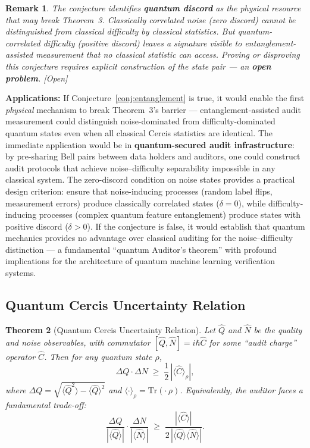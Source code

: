 \documentclass[12pt,a4paper]{article}
\newtheorem{theorem}{Theorem}[section]
\newtheorem{remark}[theorem]{Remark}
\newcommand{\openquest}{\textcolor{red!70!black}{\small\textsf{[Open]}}}
\newcommand{\Tr}{\mathrm{Tr}}
\begin{document}
\begin{remark}
The conjecture identifies \textbf{quantum discord} as the physical resource
that may break Theorem~3.  Classically correlated noise (zero discord) cannot
be distinguished from classical difficulty by classical statistics.  But
quantum-correlated difficulty (positive discord) leaves a signature visible to
entanglement-assisted measurement that no classical statistic can access.
Proving or disproving this conjecture requires explicit construction of the
state pair — an \textbf{open problem}.  \openquest
\end{remark}

\medskip\noindent
\textbf{Applications:}
If Conjecture~\ref{conj:entanglement} is true, it would enable the first
\emph{physical} mechanism to break Theorem~3's barrier — entanglement-assisted
audit measurement could distinguish noise-dominated from difficulty-dominated
quantum states even when all classical Cercis statistics are identical.
The immediate application would be in \textbf{quantum-secured audit
infrastructure}: by pre-sharing Bell pairs between data holders and auditors,
one could construct audit protocols that achieve noise--difficulty separability
impossible in any classical system.  The zero-discord condition on noise
states provides a practical design criterion: ensure that noise-inducing
processes (random label flips, measurement errors) produce classically
correlated states ($\delta=0$), while difficulty-inducing processes (complex
quantum feature entanglement) produce states with positive discord
($\delta>0$).  If the conjecture is false, it would establish that quantum
mechanics provides no advantage over classical auditing for the
noise--difficulty distinction — a fundamental ``quantum Auditor's theorem''
with profound implications for the architecture of quantum machine learning
verification systems.

\subsection{Quantum Cercis Uncertainty Relation}

\begin{theorem}[Quantum Cercis Uncertainty Relation]
\label{thm:uncertainty}
Let $\hat{Q}$ and $\hat{N}$ be the quality and noise observables, with
commutator $[\hat{Q},\hat{N}]=i\hbar\hat{C}$ for some ``audit charge''
operator $\hat{C}$.  Then for any quantum state $\rho$,
\begin{equation}\label{eq:cercis-uncertainty}
    \Delta Q \cdot \Delta N \;\geq\;
    \frac{1}{2}\,|\langle\hat{C}\rangle_\rho|,
\end{equation}
where $\Delta Q = \sqrt{\langle\hat{Q}^2\rangle-\langle\hat{Q}\rangle^2}$
and $\langle\cdot\rangle_\rho = \Tr(\cdot\,\rho)$.  Equivalently, the auditor
faces a fundamental trade-off:
\begin{equation}\label{eq:tradeoff}
    \frac{\Delta Q}{|\langle\hat{Q}\rangle|}
    \cdot \frac{\Delta N}{|\langle\hat{N}\rangle|}
    \;\geq\; \frac{|\langle\hat{C}\rangle|}
                  {2\,|\langle\hat{Q}\rangle\langle\hat{N}\rangle|}.
\end{equation}
\end{theorem}
\end{document}
